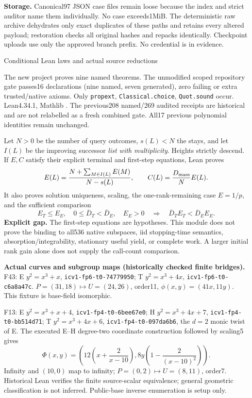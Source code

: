 \documentclass[10pt]{article}
\begin{document}
\textbf{Storage.} Canonical97 JSON case files remain loose because the index and
strict auditor name them individually. No case exceeds1MiB. The deterministic raw
archive dehydrates only exact duplicates of these paths and retains every altered
payload; restoration checks all original hashes and repacks identically. Checkpoint
uploads use only the approved branch prefix. No credential is in evidence.
\newpage
\begin{center}{\Large Conditional Lean laws and actual source reductions}\end{center}
The new  project proves nine named
theorems. The unmodified scoped repository gate passes16 declarations (nine named,
seven generated), zero failing or extra trusted/native axioms. Only
\texttt{propext}, \texttt{Classical.choice}, \texttt{Quot.sound} occur.
Lean4.34.1, Mathlib .
The previous208 named/269 audited receipts are historical and are not relabelled
as a fresh combined gate. All17 previous polynomial identities remain unchanged.

Let $N>0$ be the number of query outcomes, $s(L)<N$ the stays, and let $I(L)$
be the improving successor \emph{list with multiplicity}. Heights strictly descend.
If $E,C$ satisfy their explicit terminal and first-step equations, Lean proves
\[
 E(L)=\frac{N+\sum_{M\in I(L)}E(M)}{N-s(L)},\qquad
 C(L)=\frac{D_{\rm mass}}{N}E(L).
\]
It also proves solution uniqueness, scaling, the one-rank-remaining case $E=1/p$,
and the sufficient comparison
\[
 E_T\le E_E,\quad 0\le\bar D_T<\bar D_E,\quad E_E>0
 \quad\Longrightarrow\quad \bar D_T E_T<\bar D_E E_E.
\]
\textbf{Explicit gap.} The first-step equations are hypotheses. This module does
not prove the binding to all536 native subspaces, iid stopping-time semantics,
absorption/integrability, stationary useful yield, or complete work. A larger
initial rank gain alone does not supply the call-count comparison.

\textbf{Actual curves and subgroup maps (historically checked finite bridges).}
F43: E $y^2=x^3+x$, \texttt{icv1-fp6-t0-74779950}; T $y^2=x^3+4x$,
\texttt{icv1-fp6-t0-c6a8a47c}. $P=(31,18)\mapsto U=(24,26)$, order11,
$\phi(x,y)=(41x,11y)$. This fixture is base-field isomorphic.

F13: E $y^2=x^3+x+4$, \texttt{icv1-fp4-t0-6bee67e0};
H $y^2=x^3+4x+7$, \texttt{icv1-fp4-t0-bb514d71};
T $y^2=x^3+4x+6$, \texttt{icv1-fp4-t0-097da6b6}, the $d=2$ monic twist of E.
The executed E--H degree-two coordinate construction followed by scaling5 gives
\[
\Phi(x,y)=\left(12\left(x+\frac2{x-10}\right),
8y\left(1-\frac2{(x-10)^2}\right)\right).
\]
Infinity and $(10,0)$ map to infinity; $P=(0,2)\mapsto U=(8,11)$, order7.
Historical Lean verifies the finite source-scalar equivalence; general geometric
classification is not inferred. Public-base inverse enumeration is setup only.
\end{document}
